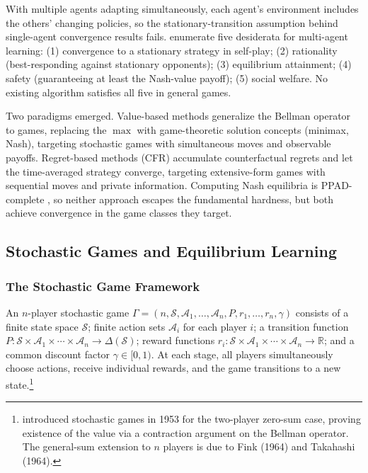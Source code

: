 
With multiple agents adapting simultaneously, each agent's environment includes the others' changing policies, so the stationary-transition assumption behind single-agent convergence results fails. \citet{shoham2007multiagent} enumerate five desiderata for multi-agent learning: (1) convergence to a stationary strategy in self-play; (2) rationality (best-responding against stationary opponents); (3) equilibrium attainment; (4) safety (guaranteeing at least the Nash-value payoff); (5) social welfare. No existing algorithm satisfies all five in general games.

Two paradigms emerged. Value-based methods generalize the Bellman operator to games, replacing the $\max$ with game-theoretic solution concepts (minimax, Nash), targeting stochastic games with simultaneous moves and observable payoffs. Regret-based methods (CFR) accumulate counterfactual regrets and let the time-averaged strategy converge, targeting extensive-form games with sequential moves and private information. Computing Nash equilibria is PPAD-complete \citep{Daskalakis2009}, so neither approach escapes the fundamental hardness, but both achieve convergence in the game classes they target.

\subsection{Stochastic Games and Equilibrium Learning}

\subsubsection{The Stochastic Game Framework}

An $n$-player stochastic game $\Gamma = (n, \mathcal{S}, \mathcal{A}_1, \ldots, \mathcal{A}_n, P, r_1, \ldots, r_n, \gamma)$ consists of a finite state space $\mathcal{S}$; finite action sets $\mathcal{A}_i$ for each player $i$; a transition function $P: \mathcal{S} \times \mathcal{A}_1 \times \cdots \times \mathcal{A}_n \to \Delta(\mathcal{S})$; reward functions $r_i: \mathcal{S} \times \mathcal{A}_1 \times \cdots \times \mathcal{A}_n \to \mathbb{R}$; and a common discount factor $\gamma \in [0,1)$. At each stage, all players simultaneously choose actions, receive individual rewards, and the game transitions to a new state.\footnote{\citet{shapley1953stochastic} introduced stochastic games in 1953 for the two-player zero-sum case, proving existence of the value via a contraction argument on the Bellman operator. The general-sum extension to $n$ players is due to Fink (1964) and Takahashi (1964).}

